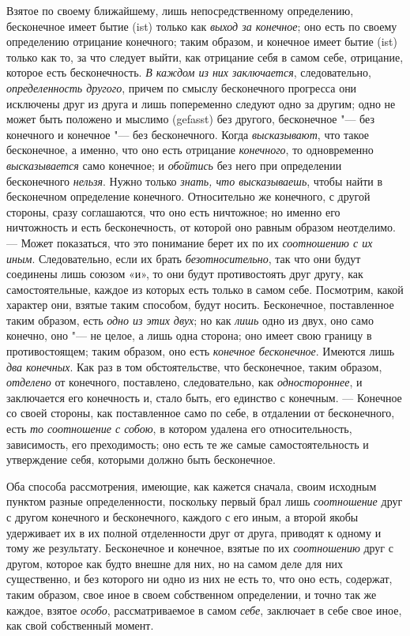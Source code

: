 Взятое по своему ближайшему, лишь непосредственному определению, бесконечное
имеет бытие (ist) только как {\em выход за конечное};
оно есть по своему определению отрицание конечного; таким образом, и
конечное имеет бытие (ist) только как то, за что следует выйти, как
отрицание себя в самом себе, отрицание, которое есть бесконечность.
{\em В каждом из них заключается}, следовательно,
{\em определенность другого}, причем по смыслу
бесконечного прогресса они исключены друг из друга и лишь попеременно
следуют одно за другим; одно не может быть положено и мыслимо (gefasst) без
другого, бесконечное "--- без конечного и конечное "--- без бесконечного. Когда
{\em высказывают}, что такое бесконечное, а именно, что
оно есть отрицание {\em конечного}, то одновременно
{\em высказывается} само конечное; и
{\em обойтись} без него при определении бесконечного
{\em нельзя}. Нужно только
{\em знать, что высказываешь}, чтобы найти в
бесконечном определение конечного. Относительно же конечного, с другой
стороны, сразу соглашаются, что оно есть ничтожное; но именно его
ничтожность и есть бесконечность, от которой оно равным образом неотделимо.
— Может показаться, что это понимание берет их по их
{\em соотношению с их иным}. Следовательно, если их
брать {\em безотносительно}, так что они будут
соединены лишь союзом «и», то они будут противостоять друг другу, как
самостоятельные, каждое из которых есть только в самом себе. Посмотрим,
какой характер они, взятые таким способом, будут носить. Бесконечное,
поставленное таким образом, есть {\em одно из этих
двух}; но как {\em лишь} одно из двух, оно само
конечно, оно "--- не целое, а лишь одна сторона; оно имеет свою границу в
противостоящем; таким образом, оно есть {\em конечное
бесконечное}. Имеются лишь {\em два конечных}. Как раз
в том обстоятельстве, что бесконечное, таким образом,
{\em отделено} от конечного, поставлено, следовательно,
как {\em одностороннее}, и заключается его конечность
и, стало быть, его единство с конечным. — Конечное со своей стороны, как
поставленное само по себе, в отдалении от бесконечного, есть
{\em то соотношение с собою}, в котором удалена его
относительность, зависимость, его преходимость; оно есть те же самые
самостоятельность и утверждение себя, которыми должно быть бесконечное.

Оба способа рассмотрения, имеющие, как кажется сначала, своим исходным
пунктом разные определенности, поскольку первый брал лишь
{\em соотношение} друг с другом конечного и
бесконечного, каждого с его иным, а второй якобы удерживает их в их
полной отделенности друг от друга, приводят к одному и тому же результату.
Бесконечное и конечное, взятые по их {\em соотношению}
друг с другом, которое как будто внешне для них, но на самом деле для них
существенно, и без которого ни одно из них не есть то, что оно есть,
содержат, таким образом, свое иное в своем собственном определении, и
точно так же каждое, взятое {\em особо},
рассматриваемое в самом {\em себе}, заключает в себе
свое иное, как свой собственный момент.

